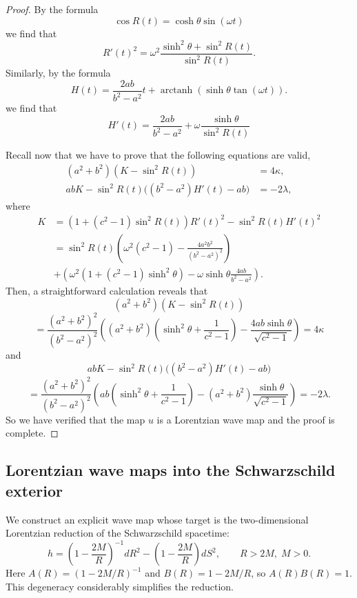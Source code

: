 \documentclass[12pt]{amsart}
\DeclareMathOperator\arctanh{arctanh}
\newcommand{\sh}{\sinh}
\begin{document}
\begin{proof}
		By the formula 
		\[
		\cos{R(t)}=\cosh\theta\sin(\omega t)
		\]
		we find that 
		\[
		R'(t)^2 =\omega^2\frac{\sinh^2\theta + \sin^2{R(t)}}{\sin^2{R(t)}}.
		\]
		Similarly, by the formula
		\[
		H(t) =  \frac{2ab}{b^2 - a^2}t + 
		\arctanh
		\left(
		\sh\theta \tan(\omega t)
		\right).
		\]
		we find that
		\[
		H'(t)=\frac{2ab}{b^2-a^2}+\omega\frac{\sinh{\theta}}{\sin^2{R(t)}}
		\]
		
		Recall now that we have to prove that the following equations are valid,
		\begin{align*}
			(a^{2}+b^{2})(K- \sin^2{R(t)})
			&=
			4\kappa,\\[0.3em]
			abK-\sin^2{R(t)}\big( (b^{2}-a^{2})H'(t) - ab\big)
			&=
			-2\lambda,
		\end{align*}
		where
		\begin{align*}
			K &= (1+(c^2-1)\sin^2{R(t)}) R'(t)^{2} - \sin^2{R(t)} H'(t)^{2}\\
			&=\sin^2{R(t)}
			\left( \omega^2 (c^2-1)-\frac{4a^2b^2}{(b^2-a^2)^2}\right)
			\\
			&+\left(\omega^2 (1+(c^2-1)\sinh^2{\theta})-\omega\sinh{\theta} \frac{4ab}{b^2-a^2} \right) .
		\end{align*}
		Then, a straightforward calculation reveals that
		\[
		(a^{2}+b^{2})(K- \sin^2{R(t)})
		\]
		\[
		=\frac{(a^2 + b^2)^2}{(b^2 - a^2)^2}
		\left(
		(a^2 + b^2)
		\left(\sh^2\theta + \frac{1}{c^2 - 1}\right) - 
		\frac{4ab\sh\theta}{\sqrt{c^2 - 1}}
		\right) =4\kappa   
		\] 
		and 
		\[
		abK-\sin^2{R(t)}\big( (b^{2}-a^{2})H'(t) - ab\big)
		\]
		\[
		=\frac{(a^2 + b^2)^2}{(b^2 - a^2)^2}
		\left(
		ab\left(\sh^2\theta + \frac{1}{c^2 - 1}\right) -(a^2 + b^2)\frac{\sh\theta}{\sqrt{c^2 - 1}}
		\right) =-2\lambda.
		\]
		So we have verified that the map $u$ is a Lorentzian wave map and the proof is complete.
	\end{proof}

\subsection{Lorentzian wave maps into the Schwarzschild exterior}

We construct an explicit wave map whose target is the two-dimensional
Lorentzian reduction of the Schwarzschild spacetime:
\[
h = \left(1 - \frac{2M}{R}\right)^{-1}dR^2
  - \left(1 - \frac{2M}{R}\right)dS^2,
\qquad R > 2M,\; M > 0.
\]
Here $A(R) = (1-2M/R)^{-1}$ and $B(R) = 1-2M/R$, so
$A(R)B(R) = 1$. This degeneracy considerably simplifies the
reduction.
\end{document}
